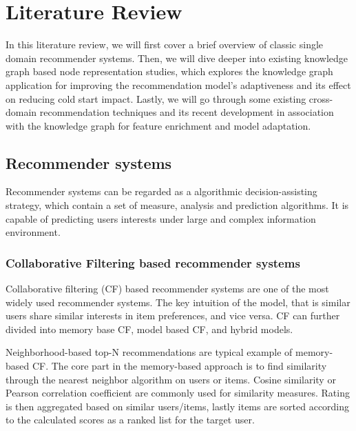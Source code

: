 \section{Literature Review}
In this literature review, we will first cover a brief overview of classic single domain recommender systems. Then, we will dive deeper into existing knowledge graph based node representation studies, which explores the knowledge graph application for improving the recommendation model's adaptiveness and its effect on reducing cold start impact. Lastly, we will go through some existing cross-domain recommendation techniques and its recent development in association with the knowledge graph for feature enrichment and model adaptation.

\subsection{Recommender systems}
Recommender systems can be regarded as a algorithmic decision-assisting strategy, which contain a set of measure, analysis and prediction algorithms. It is capable of predicting users interests under large and complex information environment.

\bigskip
\subsubsection{Collaborative Filtering based recommender systems}
Collaborative filtering (CF) based recommender systems are one of the most widely used recommender systems. The key intuition of the model, that is similar users share similar interests in item preferences, and vice versa. CF can further divided into memory base CF, model based CF, and hybrid models.

Neighborhood-based top-N recommendations are typical example of memory-based CF. The core part in the memory-based approach is to find similarity through the nearest neighbor algorithm on users or items. Cosine similarity or Pearson correlation coefficient \citep{sarwar2001item} are commonly used for similarity measures. Rating is then aggregated based on similar users/items, lastly items are sorted according to the calculated scores as a ranked list for the target user. 

